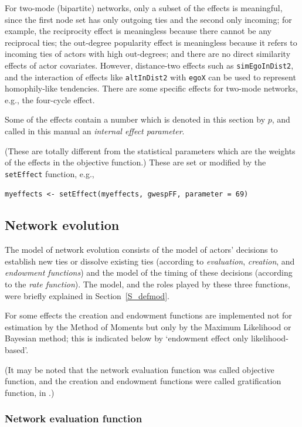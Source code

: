 \documentclass[a4paper,fleqn,11pt]{article}
\newcommand{\+}{\, + \,}
\begin{document}
For two-mode (bipartite) networks, only a subset of the effects is
meaningful, since the first node set has only outgoing ties
and the second only incoming; for example, the reciprocity effect
is meaningless because there cannot be any reciprocal ties;
the out-degree popularity effect is meaningless because it refers to
incoming ties of actors with high out-degrees; and there are no direct
similarity effects of actor covariates. However, distance-two effects
such as \texttt{simEgoInDist2}, and the interaction of effects like
\texttt{altInDist2} with \texttt{egoX} can be used to represent
homophily-like tendencies.
There are some specific effects for two-mode networks, e.g.,
the four-cycle effect.

\hypertarget{T_effpar}{
Some of the effects contain a number which is denoted in this section
by $p$, and called in this manual an \emph{internal effect parameter}.
}
(These are totally different from the statistical parameters which are
the weights of the effects in the objective function.)
These are set or modified by the \texttt{setEffect} function, e.g.,
\begin{verbatim}
myeffects <- setEffect(myeffects, gwespFF, parameter = 69)
\end{verbatim}

\subsection{Network evolution}
The model of network evolution consists of the model of actors'
decisions to establish new ties or dissolve existing ties
(according to {\it evaluation}, {\it creation},
and {\it endowment functions}) and the
model of the timing of these decisions (according to the {\it rate
function}).
The model, and the roles played by these three functions,
were briefly explained in Section~\ref{S_defmod}.

For some effects
the creation and endowment functions are
implemented not for estimation by the Method of Moments
but only by the Maximum Likelihood or Bayesian method;
this is indicated below by `endowment effect only likelihood-based'.

(It may be noted that the network evaluation function
was called objective function,
and the creation and endowment functions were called gratification function,
in \citet{Snijders01}.)

\subsubsection{Network evaluation function}
\label{S_f}
\end{document}

